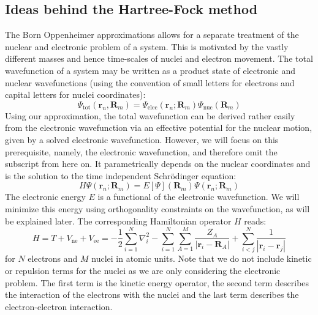 \subsection{Ideas behind the Hartree-Fock method}
\label{subsec:background_hf}
The Born Oppenheimer approximations allows for a separate treatment of the nuclear and electronic problem of a system. This is motivated by the vastly different masses and hence time-scales of nuclei and electron movement. The total wavefunction of a system may be written as a product state of electronic and nuclear wavefunctions (using the convention of small letters for electrons and capital letters for nuclei coordinates):
\begin{equation}
    \Psi_{\text{tot}}(\mathbf{r}_n, \mathbf{R}_m) = \Psi_{\text{elec}}(\mathbf{r}_n; \mathbf{R}_m) \Psi_{\text{nuc}}(\mathbf{R}_m)
\end{equation}
Using our approximation, the total wavefunction can be derived rather easily from the electronic wavefunction via an effective potential for the nuclear motion, given by a solved electronic wavefunction. However, we will focus on this prerequisite, namely, the electronic wavefunction, and therefore omit the subscript from here on. It parametrically depends on the nuclear coordinates and is the solution to the time independent Schrödinger equation:
\begin{equation}
    H \Psi(\mathbf{r}_n; \mathbf{R}_m) = E[\Psi](\mathbf{R}_m) \Psi(\mathbf{r}_n; \mathbf{R}_m)
\end{equation}
The electronic energy $E$ is a functional of the electronic wavefunction. We will minimize this energy using orthogonality constraints on the wavefunction, as will be explained later. The corresponding Hamiltonian operator $H$ reads: 
\begin{equation}
    H = T + V_{\text{ne}} + V_{\text{ee}} = -\frac{1}{2} \sum_{i=1}^N \nabla_i^2 - \sum_{i=1}^N \sum_{A=1}^M \frac{Z_A}{|\mathbf{r}_i - \mathbf{R}_A|} + \sum_{i<j}^N \frac{1}{|\mathbf{r}_i - \mathbf{r}_j|}
\end{equation}
for $N$ electrons and $M$ nuclei in atomic units. Note that we do not include kinetic or repulsion terms for the nuclei as we are only considering the electronic problem. The first term is the kinetic energy operator, the second term describes the interaction of the electrons with the nuclei and the last term describes the electron-electron interaction.\\

